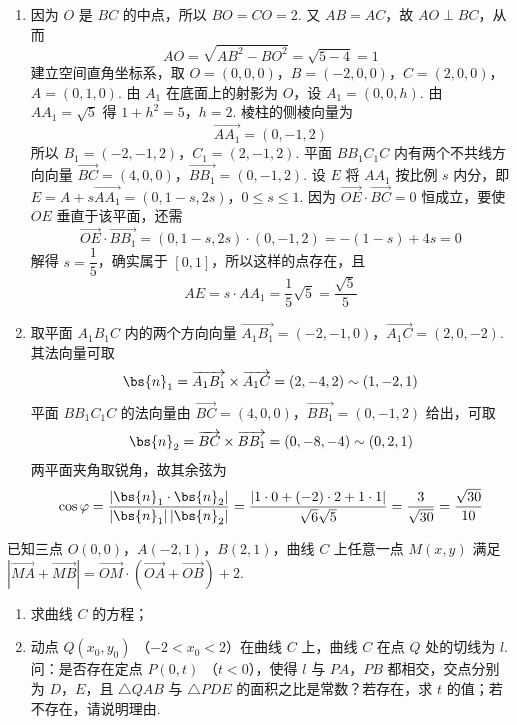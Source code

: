 \begin{solution}
\begin{enumerate}
\item 因为 \(O\) 是 \(BC\) 的中点，所以 \(BO=CO=2\). 又 \(AB=AC\)，故 \(AO\perp BC\)，从而
\[
AO=\sqrt{AB^2-BO^2}=\sqrt{5-4}=1
\]
建立空间直角坐标系，取
\(O=(0,0,0)\)，\(B=(-2,0,0)\)，\(C=(2,0,0)\)，\(A=(0,1,0)\).
由 \(A_1\) 在底面上的射影为 \(O\)，设 \(A_1=(0,0,h)\). 由 \(AA_1=\sqrt5\) 得
\(1+h^2=5\)，\(h=2\).
棱柱的侧棱向量为
\[
\overrightarrow{AA_1}=(0,-1,2)
\]
所以
\(B_1=(-2,-1,2)\)，\(C_1=(2,-1,2)\).
平面 \(BB_1C_1C\) 内有两个不共线方向向量
\(\overrightarrow{BC}=(4,0,0)\)，\(\overrightarrow{BB_1}=(0,-1,2)\).
设 \(E\) 将 \(AA_1\) 按比例 \(s\) 内分，即
\(E=A+s\overrightarrow{AA_1}=(0,1-s,2s)\)，\(0\leqslant s\leqslant1\).
因为 \(\overrightarrow{OE}\cdot\overrightarrow{BC}=0\) 恒成立，要使 \(OE\) 垂直于该平面，还需
\[
\overrightarrow{OE}\cdot\overrightarrow{BB_1}
=(0,1-s,2s)\cdot(0,-1,2)
=-(1-s)+4s=0
\]
解得 \(s=\dfrac15\)，确实属于 \([0,1]\)，所以这样的点存在，且
\[
AE=s\cdot AA_1=\frac15\sqrt5=\frac{\sqrt5}{5}
\]

\item 取平面 \(A_1B_1C\) 内的两个方向向量
\(\overrightarrow{A_1B_1}=(-2,-1,0)\)，\(\overrightarrow{A_1C}=(2,0,-2)\).
其法向量可取
\[
\bs{n}_1=\overrightarrow{A_1B_1}\times\overrightarrow{A_1C}
=(2,-4,2)\sim(1,-2,1)
\]
平面 \(BB_1C_1C\) 的法向量由
\(\overrightarrow{BC}=(4,0,0)\)，\(\overrightarrow{BB_1}=(0,-1,2)\)
给出，可取
\[
\bs{n}_2=\overrightarrow{BC}\times\overrightarrow{BB_1}
=(0,-8,-4)\sim(0,2,1)
\]
两平面夹角取锐角，故其余弦为
\[
\cos\varphi
=\frac{|\bs{n}_1\cdot\bs{n}_2|}
{|\bs{n}_1|\,|\bs{n}_2|}
=\frac{|1\cdot0+(-2)\cdot2+1\cdot1|}
{\sqrt6\sqrt5}
=\frac3{\sqrt{30}}
=\frac{\sqrt{30}}{10}
\]
\end{enumerate}
\end{solution}

\begin{problem}
已知三点 \(O(0,0)\)，\(A(-2,1)\)，\(B(2,1)\)，曲线 \(C\) 上任意一点 \(M(x,y)\) 满足 \(\left|\overrightarrow{MA} + \overrightarrow{MB}\right| = \overrightarrow{OM} \cdot \left(\overrightarrow{OA} + \overrightarrow{OB}\right) + 2\).
\begin{enumerate}
\item 求曲线 \(C\) 的方程；
\item 动点 \(Q(x_0, y_0)\) （\(-2 < x_0 < 2\)）在曲线 \(C\) 上，曲线 \(C\) 在点 \(Q\) 处的切线为 \(l\). 问：是否存在定点 \(P(0, t)\) （\(t < 0\)），使得 \(l\) 与 \(PA\)，\(PB\) 都相交，交点分别为 \(D\)，\(E\)，且 \(\triangle QAB\) 与 \(\triangle PDE\) 的面积之比是常数？若存在，求 \(t\) 的值；若不存在，请说明理由.
\end{enumerate}
\end{problem}

